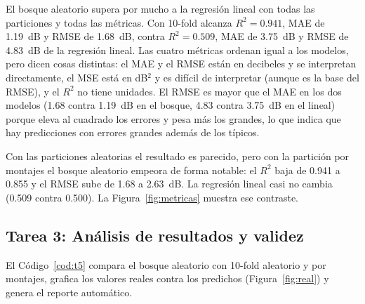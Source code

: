 \documentclass[11pt,letterpaper]{article}
\begin{document}
El bosque aleatorio supera por mucho a la regresión lineal con todas las particiones y todas las métricas. Con 10-fold alcanza $R^2 = 0.941$, MAE de 1.19~dB y RMSE de 1.68~dB, contra $R^2 = 0.509$, MAE de 3.75~dB y RMSE de 4.83~dB de la regresión lineal. Las cuatro métricas ordenan igual a los modelos, pero dicen cosas distintas: el MAE y el RMSE están en decibeles y se interpretan directamente, el MSE está en dB$^2$ y es difícil de interpretar (aunque es la base del RMSE), y el $R^2$ no tiene unidades. El RMSE es mayor que el MAE en los dos modelos (1.68 contra 1.19~dB en el bosque, 4.83 contra 3.75~dB en el lineal) porque eleva al cuadrado los errores y pesa más los grandes, lo que indica que hay predicciones con errores grandes además de los típicos.

Con las particiones aleatorias el resultado es parecido, pero con la partición por montajes el bosque aleatorio empeora de forma notable: el $R^2$ baja de 0.941 a 0.855 y el RMSE sube de 1.68 a 2.63~dB. La regresión lineal casi no cambia (0.509 contra 0.500). La Figura~\ref{fig:metricas} muestra ese contraste.

\subsection{Tarea 3: Análisis de resultados y validez}

El Código~\ref{cod:t5} compara el bosque aleatorio con 10-fold aleatorio y por montajes, grafica los valores reales contra los predichos (Figura~\ref{fig:real}) y genera el reporte automático.
\end{document}
